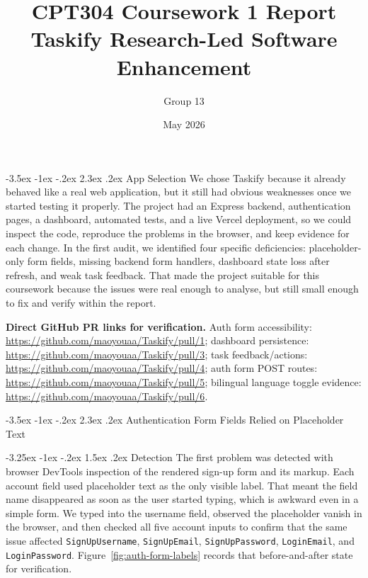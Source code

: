 ﻿\documentclass[12pt,a4paper]{article}
\title{CPT304 Coursework 1 Report\\Taskify Research-Led Software Enhancement}
\author{Group 13}
\date{May 2026}
\makeatletter
\renewcommand\section{\@startsection{section}{1}{\z@}%
  {-3.5ex \@plus -1ex \@minus -.2ex}%
  {2.3ex \@plus .2ex}%
  {\normalfont\bfseries\fontsize{14}{16}\selectfont}}
\renewcommand\subsection{\@startsection{subsection}{2}{\z@}%
  {-3.25ex \@plus -1ex \@minus -.2ex}%
  {1.5ex \@plus .2ex}%
  {\normalfont\bfseries\fontsize{12}{14}\selectfont}}
\makeatother
\begin{document}
\maketitle

\section{App Selection}
We chose Taskify because it already behaved like a real web application, but it
still had obvious weaknesses once we started testing it properly. The project
had an Express backend, authentication pages, a dashboard, automated tests, and
a live Vercel deployment, so we could inspect the code, reproduce the problems
in the browser, and keep evidence for each change. In the first audit, we
identified four specific deficiencies:
placeholder-only form fields, missing backend form handlers, dashboard state
loss after refresh, and weak task feedback. That made the project suitable for
this coursework because the issues were real enough to analyse, but still small
enough to fix and verify within the report.

\noindent\textbf{Direct GitHub PR links for verification.} Auth form
accessibility: \url{https://github.com/maoyouaa/Taskify/pull/1}; dashboard
persistence: \url{https://github.com/maoyouaa/Taskify/pull/3}; task
feedback/actions: \url{https://github.com/maoyouaa/Taskify/pull/4}; auth form
POST routes: \url{https://github.com/maoyouaa/Taskify/pull/5}; bilingual
language toggle evidence: \url{https://github.com/maoyouaa/Taskify/pull/6}.

\section{Authentication Form Fields Relied on Placeholder Text}

\subsection{Detection}
The first problem was detected with browser DevTools inspection of the rendered
sign-up form and its markup. Each account field
used placeholder text as the only visible label. That meant the field name
disappeared as soon as the user started typing, which is awkward even in a
simple form. We typed into the username field, observed the placeholder vanish
in the browser, and then checked all five account inputs to confirm that the
same issue affected \texttt{SignUpUsername}, \texttt{SignUpEmail},
\texttt{SignUpPassword}, \texttt{LoginEmail}, and \texttt{LoginPassword}.
Figure~\ref{fig:auth-form-labels} records that before-and-after state for
verification.
\end{document}
